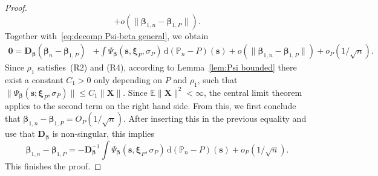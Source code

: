 \documentclass{article}
\numberwithin{equation}{section}
\theoremstyle{plain}
\newcommand{\dd}{\mathrm{d}}
\newcommand{\bbeta}{\bm\beta}
\newcommand{\bxi}{\bm\xi}
\newcommand{\bs}{\mathbf{s}}
\newcommand{\bX}{\mathbf{X}}
\newcommand{\bD}{\mathbf{D}}
\newcommand{\E}{\mathbb{E}}
\begin{document}
\begin{proof}
\[+
o(\|\bbeta_{1,n}-\bbeta_{1,P}\|).
\]
Together with~\eqref{eq:decomp Psi-beta general}, we obtain
\[
\begin{split}
\mathbf{0}
=
\bD_{\bbeta}
(\bbeta_n-\bbeta_{1,P})
&+
\int \Psi_{\bbeta}(\mathbf{s},\bxi_P,\sigma_P)\,\dd (\mathbb{P}_n-P)(\mathbf{s})
+
o(\|\bbeta_{1,n}-\bbeta_{1,P}\|)
+
o_P(1/\sqrt{n}).
\end{split}
\]
Since $\rho_1$ satisfies~(R2) and (R4),
according to Lemma~\ref{lem:Psi bounded} there exist a constant $C_1>0$ only depending on $P$ and $\rho_1$, such that
$\|\Psi_{\bbeta}(\bs;\bxi_P,\sigma_P)\|
\leq
C_1\|\bX\|$.
Since $\E\|\bX\|^2<\infty$, the central limit theorem applies to the second term on the right hand side.
From this, we first conclude that $\bbeta_{1,n}-\bbeta_{1,P}=O_P(1/\sqrt{n})$.
After inserting this in the previous equality and use that $\bD_{\bbeta}$ is non-singular, this implies
\[
\bbeta_{1,n}-\bbeta_{1,P}
=
-
\bD_{\bbeta}^{-1}
\int 
\Psi_{\bbeta}(\mathbf{s},\bxi_P,\sigma_P)
\,\dd (\mathbb{P}_n-P)(\mathbf{s})
+
o_P(1/\sqrt{n}).
\]
This finishes the proof.
\end{proof}
\end{document}
